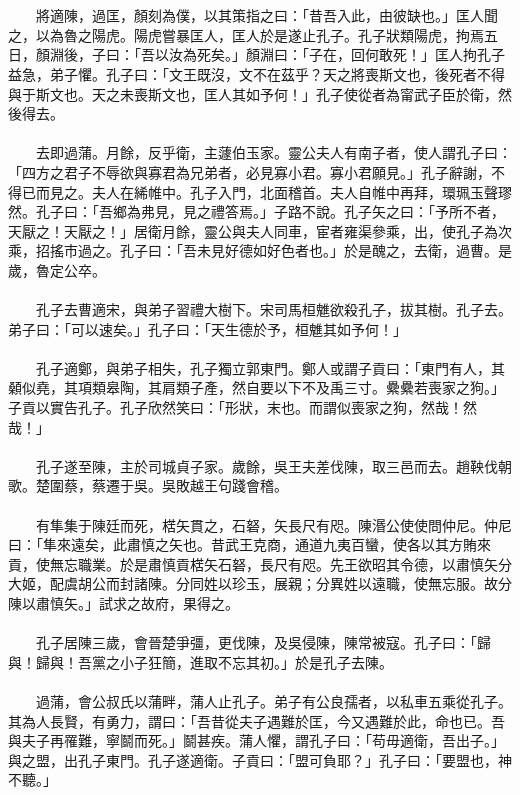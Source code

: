 \\\\
　　將適陳，過匡，顏刻為僕，以其策指之曰：「昔吾入此，由彼缺也。」匡人聞之，以為魯之陽虎。陽虎嘗暴匡人，匡人於是遂止孔子。孔子狀類陽虎，拘焉五日，顏淵後，子曰：「吾以汝為死矣。」顏淵曰：「子在，回何敢死！」匡人拘孔子益急，弟子懼。孔子曰：「文王既沒，文不在茲乎？天之將喪斯文也，後死者不得與于斯文也。天之未喪斯文也，匡人其如予何！」孔子使從者為甯武子臣於衛，然後得去。
\\\\
　　去即過蒲。月餘，反乎衛，主蘧伯玉家。靈公夫人有南子者，使人謂孔子曰：「四方之君子不辱欲與寡君為兄弟者，必見寡小君。寡小君願見。」孔子辭謝，不得已而見之。夫人在絺帷中。孔子入門，北面稽首。夫人自帷中再拜，環珮玉聲璆然。孔子曰：「吾鄉為弗見，見之禮答焉。」子路不說。孔子矢之曰：「予所不者，天厭之！天厭之！」居衛月餘，靈公與夫人同車，宦者雍渠參乘，出，使孔子為次乘，招搖市過之。孔子曰：「吾未見好德如好色者也。」於是醜之，去衛，過曹。是歲，魯定公卒。
\\\\
　　孔子去曹適宋，與弟子習禮大樹下。宋司馬桓魋欲殺孔子，拔其樹。孔子去。弟子曰：「可以速矣。」孔子曰：「天生德於予，桓魋其如予何！」
\\\\
　　孔子適鄭，與弟子相失，孔子獨立郭東門。鄭人或謂子貢曰：「東門有人，其顙似堯，其項類皋陶，其肩類子產，然自要以下不及禹三寸。纍纍若喪家之狗。」子貢以實告孔子。孔子欣然笑曰：「形狀，末也。而謂似喪家之狗，然哉！然哉！」
\\\\
　　孔子遂至陳，主於司城貞子家。歲餘，吳王夫差伐陳，取三邑而去。趙鞅伐朝歌。楚圍蔡，蔡遷于吳。吳敗越王句踐會稽。
\\\\
　　有隼集于陳廷而死，楛矢貫之，石砮，矢長尺有咫。陳湣公使使問仲尼。仲尼曰：「隼來遠矣，此肅慎之矢也。昔武王克商，通道九夷百蠻，使各以其方賄來貢，使無忘職業。於是肅慎貢楛矢石砮，長尺有咫。先王欲昭其令德，以肅慎矢分大姬，配虞胡公而封諸陳。分同姓以珍玉，展親；分異姓以遠職，使無忘服。故分陳以肅慎矢。」試求之故府，果得之。
\\\\
　　孔子居陳三歲，會晉楚爭彊，更伐陳，及吳侵陳，陳常被寇。孔子曰：「歸與！歸與！吾黨之小子狂簡，進取不忘其初。」於是孔子去陳。
\\\\
　　過蒲，會公叔氏以蒲畔，蒲人止孔子。弟子有公良孺者，以私車五乘從孔子。其為人長賢，有勇力，謂曰：「吾昔從夫子遇難於匡，今又遇難於此，命也已。吾與夫子再罹難，寧鬬而死。」鬬甚疾。蒲人懼，謂孔子曰：「苟毋適衛，吾出子。」與之盟，出孔子東門。孔子遂適衛。子貢曰：「盟可負耶？」孔子曰：「要盟也，神不聽。」
